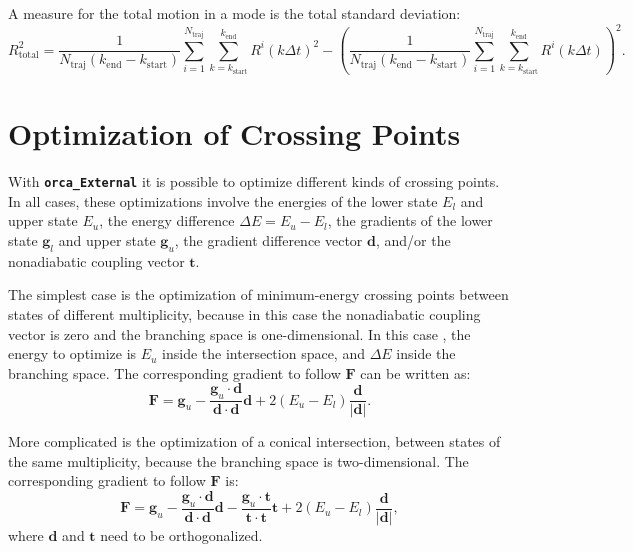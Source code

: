 \documentclass[a4paper,10pt,DIV=15,openany]{scrbook}
\newcommand{\ttt}[1]{\textbf{\texttt{#1}}}
\newcommand{\VEC}[1]{\ensuremath{\mathbf{#1}}}
\begin{document}
A measure for the total motion in a mode is the total standard deviation:
\begin{equation}
  R_\text{total}^2=
  \frac{1}{N_\text{traj}(k_\text{end}-k_\text{start})}
  \sum_{i=1}^{N_\text{traj}}
  \sum_{k=k_\text{start}}^{k_\text{end}} 
  R^i(k\Delta t)^2
  -
  \left(
  \frac{1}{N_\text{traj}(k_\text{end}-k_\text{start})}
  \sum_{i=1}^{N_\text{traj}}
  \sum_{k=k_\text{start}}^{k_\text{end}} 
  R^i(k\Delta t)
  \right)^2.
\end{equation}


\section{Optimization of Crossing Points}\label{met:orcaopt}

With \ttt{orca\_External} it is possible to optimize different kinds of crossing points.
In all cases, these optimizations involve the energies of the lower state $E_l$ and upper state $E_u$, the energy difference $\Delta E=E_u-E_l$, the gradients of the lower state $\VEC{g}_l$ and upper state $\VEC{g}_u$, the gradient difference vector $\VEC{d}$, and/or the nonadiabatic coupling vector $\VEC{t}$.

The simplest case is the optimization of minimum-energy crossing points between states of different multiplicity, because in this case the nonadiabatic coupling vector is zero and the branching space is one-dimensional.
In this case \cite{Bearpark1994CPL}, the energy to optimize is $E_u$ inside the intersection space, and $\Delta E$ inside the branching space.
The corresponding gradient to follow $\VEC{F}$ can be written as:
\begin{equation}
  \VEC{F}=\VEC{g}_u-\frac{\VEC{g}_u\cdot\VEC{d}}{\VEC{d}\cdot\VEC{d}}\VEC{d}+2(E_u-E_l)\frac{\VEC{d}}{|\VEC{d}|}.
\end{equation}

More complicated is the optimization of a conical intersection, between states of the same multiplicity, because the branching space is two-dimensional.
The corresponding gradient to follow $\VEC{F}$ is:
\begin{equation}
  \VEC{F}=\VEC{g}_u
  -\frac{\VEC{g}_u\cdot\VEC{d}}{\VEC{d}\cdot\VEC{d}}\VEC{d}
  -\frac{\VEC{g}_u\cdot\VEC{t}}{\VEC{t}\cdot\VEC{t}}\VEC{t}
  +2(E_u-E_l)\frac{\VEC{d}}{|\VEC{d}|},
\end{equation}
where $\VEC{d}$ and $\VEC{t}$ need to be orthogonalized.
\end{document}
